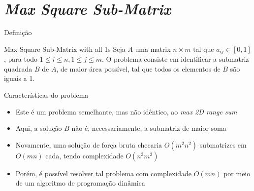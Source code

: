 \section{\it Max Square Sub-Matrix}

\begin{frame}[fragile]{Definição}

    \begin{block}{Max Square Sub-Matrix with all 1s}
        Seja $A$ uma matrix $n\times m$ tal que $a_{ij} \in [0, 1]$, para todo $1\leq i\leq n,
            1\leq j\leq m$. O problema consiste em identificar a submatriz quadrada $B$ de $A$,
            de maior área possível, tal que todos os elementos de $B$ são iguais a 1.
    \end{block}

\end{frame}

\begin{frame}[fragile]{Características do problema}

    \begin{itemize}
        \item Este é um problema semelhante, mas não idêntico, ao \textit{max 2D range sum}

        \item Aqui, a solução $B$ não é, necessariamente, a submatriz de maior soma

        \item Novamente, uma solução de força bruta checaria $O(m^2n^2)$ submatrizes em $O(mn)$
            cada, tendo complexidade $O(n^3m^3)$

        \item Porém, é possível resolver tal problema com complexidade $O(mn)$ por meio de um
            algoritmo de programação dinâmica
    \end{itemize}

\end{frame}

